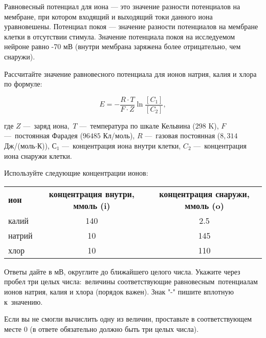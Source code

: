 
Равновесный потенциал для иона — это значение разности потенциалов на мембране, при котором входящий и выходящий токи данного иона уравновешены. Потенциал покоя — значение разности потенциалов на мембране клетки в отсутствии стимула. Значение потенциала покоя на исследуемом нейроне равно -70 мВ (внутри мембрана заряжена более отрицательно, чем снаружи).

Рассчитайте значение равновесного потенциала для ионов натрия, калия и хлора по формуле:

$$E = -\dfrac{R\cdot T}{F\cdot Z}\ln \dfrac{[C_1]}{[C_2]},$$

где $Z$ — заряд иона, $T$ — температура по шкале Кельвина ($298$ K), $F$ — постоянная Фарадея ($96485$ Кл/моль), $R$ — газовая постоянная ($8,314$ Дж/(моль$\cdot$К)), $С_1$ — концентрация иона внутри клетки, $C_2$ — концентрация иона снаружи клетки.

Используйте следующие концентрации ионов:

\begin{tabular}{|l|c|c|}
    \bf ион & \bf концентрация внутри, ммоль (i) & \bf концентрация снаружи, ммоль (o) \\
    калий & 140 & 2.5 \\
    натрий & 10 & 145 \\
    хлор & 10 & 110 \\
\end{tabular}

Ответы дайте в мВ, округлите до ближайшего целого числа. Укажите через пробел три целых числа: величины соответствующие равновесным потенциалам ионов натрия, калия и хлора (порядок важен). Знак "-" пишите вплотную к значению.

Если вы не смогли вычислить одну из величин, проставьте в соответствующем месте 0 (в ответе обязательно должно быть три целых числа). 


